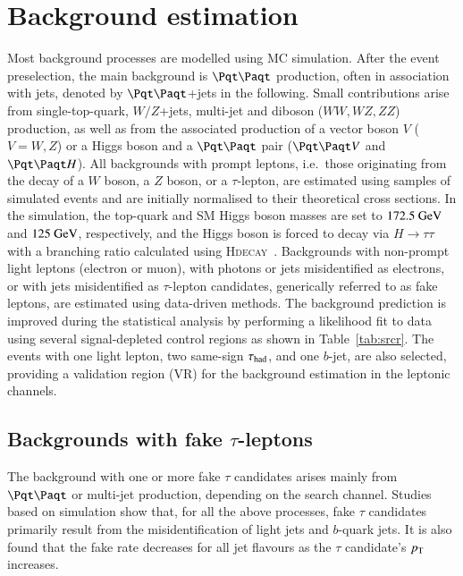 \section{Background estimation}
\label{sec:background_model}

Most background processes are modelled using MC simulation.
After the event preselection, the main background is $\ttbar$ production, often in association with jets, denoted by $\ttbar$+jets in the following.
Small contributions arise from single-top-quark, $W/Z$+jets, multi-jet and diboson ($WW,WZ,ZZ$) production, as well as from the associated 
production of a vector boson $V$ ($V=W,Z$) or a Higgs boson and a $\ttbar$ pair ($\ttbar V$ and $\ttbar H$). All backgrounds 
with prompt leptons, i.e.\ those originating from the decay of a $W$ boson, a $Z$ boson, or a $\tau$-lepton,
are estimated using samples of simulated events and are initially normalised to their theoretical cross sections.
In the simulation, the top-quark and SM Higgs boson masses are set to $172.5~\text{GeV}$ and $125~\text{GeV}$, respectively,
and the Higgs boson is forced to decay via $H\to \tau\tau$ with a branching ratio calculated using \textsc{Hdecay}~\cite{Djouadi:1997yw}.  
Backgrounds with non-prompt light leptons (electron or muon), with photons or jets misidentified as electrons, or with jets misidentified as $\tau$-lepton candidates, 
generically referred to as fake leptons, are estimated using data-driven methods. 
The background prediction is improved during the statistical analysis by performing a likelihood 
fit to data using several signal-depleted control regions as shown in Table~\ref{tab:srcr}.
The events with one light lepton, two same-sign $\tau_{\mathrm{had}}$, and one $b$-jet, are also selected, providing a validation region (VR) for the background estimation in the leptonic channels. 
\subsection{Backgrounds with fake $\tau$-leptons}
\label{sec:faketaus}
The background with one or more fake $\tau$ candidates arises mainly from $\ttbar$ or
multi-jet production, depending on the search channel.
Studies based on simulation show that, for all the above processes, fake $\tau$ candidates primarily result from the
misidentification of light jets and $b$-quark jets.
It is also found that the fake rate decreases for all jet flavours as the $\tau$ candidate's $p_{\text{T}}$ increases.

